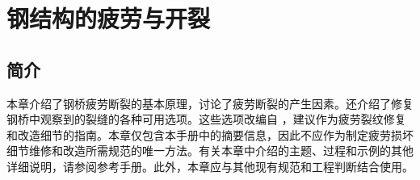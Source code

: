 \chapter{钢结构的疲劳与开裂}
\label{chp:fatigue-fracture-steel-structures}
\section{简介}
本章介绍了钢桥疲劳断裂的基本原理，讨论了疲劳断裂的产生因素。还介绍了修复钢桥中观察到的裂缝的各种可用选项。这些选项改编自  \cite{dexter2008m}，建议作为疲劳裂纹修复和改造细节的指南。本章仅包含本手册中的摘要信息，因此不应作为制定疲劳损坏细节维修和改造所需规范的唯一方法。有关本章中介绍的主题、过程和示例的其他详细说明，请参阅参考手册。此外，本章应与其他现有规范和工程判断结合使用。

